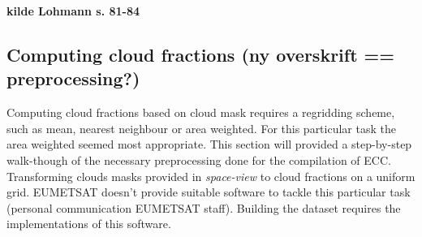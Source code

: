 \textbf{kilde Lohmann s. 81-84}

\subsection{Computing cloud fractions (ny overskrift == preprocessing?)} \label{sec:remapping}

Computing cloud fractions based on cloud mask requires a regridding scheme, such as mean, nearest neighbour or area weighted. For this particular task the area weighted seemed most appropriate. This section will provided a step-by-step walk-though of the necessary preprocessing done for the compilation of ECC. Transforming clouds masks provided in \textit{space-view} to cloud fractions on a uniform grid. EUMETSAT doesn't provide suitable software to tackle this particular task (personal communication EUMETSAT staff). Building the dataset requires the implementations of this software.

